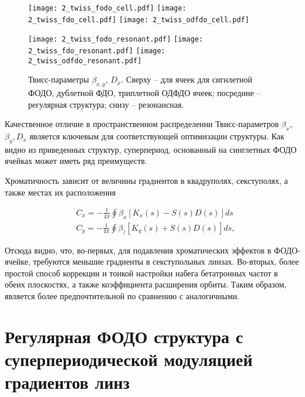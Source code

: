 \begin{figure} [h!]

   \texttt{[image: 2\_twiss\_fodo\_cell.pdf]}
   \texttt{[image: 2\_twiss\_fdo\_cell.pdf]}
   \texttt{[image: 2\_twiss\_odfdo\_cell.pdf]}

   \texttt{[image: 2\_twiss\_fodo\_resonant.pdf]}
   \texttt{[image: 2\_twiss\_fdo\_resonant.pdf]}
   \texttt{[image: 2\_twiss\_odfdo\_resonant.pdf]}

   \caption{Твисс-параметры $\beta_{x,y}$, $D_{x}$. Сверху -- для ячеек для сигнлетной ФОДО, дублетной ФДО, триплетной ОДФДО ячеек; посредине -- регулярная структура; снизу -- резонансная.}
   \label{fig:fodo_fdo_odfdo}
\end{figure}

\par Качественное отличие в пространственном распределении Твисс-параметров $\beta_{x}$, $\beta_{y}, D_{x}$ является ключевым для соответствующей оптимизации структуры.
Как видно из приведенных структур, суперпериод, основанный на синглетных ФОДО ячейках может иметь ряд преимуществ.

\noindent Хроматичность зависит от величины градиентов в квадруполях, секступолях, а также местах их расположения \cite{lee}

\begin{equation}
\begin{aligned}
& C_x=-\frac{1}{4 \pi} \oint \beta_x\left[K_x(s)-S(s) D(s)\right] d s \\
& C_y=-\frac{1}{4 \pi} \oint \beta_z\left[K_y(s)+S(s) D(s)\right] d s,
\end{aligned}
\end{equation}

\noindent Отсюда видно, что, во-первых, для подавления хроматических эффектов в ФОДО-ячейке, требуются меньшие градиенты в секступольных линзах. Во-вторых, более простой способ коррекции и тонкой настройки набега бетатронных частот в обеих плоскостях, а также коэффициента расширения орбиты. Таким образом, является более предпочтительной по сравнению с аналогичными.

	\section{Регулярная ФОДО структура с суперпериодической модуляцией градиентов линз}\label{sec:transition_variation/methods/FODO}

